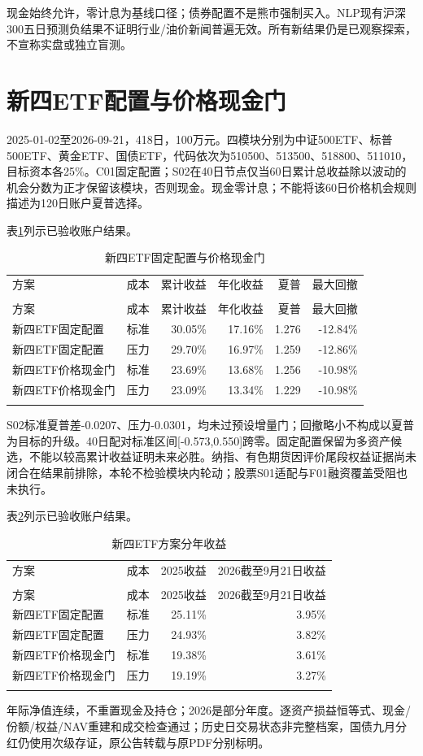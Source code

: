 \documentclass[12pt]{article}
\newcommand{\toprule}{\noalign{\hrule height .8pt}}
\newcommand{\midrule}{\noalign{\hrule height .4pt}}
\newcommand{\bottomrule}{\noalign{\hrule height .8pt}}
\begin{document}
现金始终允许，零计息为基线口径；债券配置不是熊市强制买入。NLP现有沪深300五日预测负结果不证明行业/油价新闻普遍无效。所有新结果仍是已观察探索，不宣称实盘或独立盲测。

\section{新四ETF配置与价格现金门}
2025-01-02至2026-09-21，418日，100万元。四模块分别为中证500ETF、标普500ETF、黄金ETF、国债ETF，代码依次为510500、513500、518800、511010，目标资本各25\%。C01固定配置；S02在40日节点仅当60日累计总收益除以波动的机会分数为正才保留该模块，否则现金。现金零计息；不能将该60日价格机会规则描述为120日账户夏普选择。

表\ref{tab:v3supp3}列示已验收账户结果。
{\footnotesize
\begin{longtable}{@{}lrrrrr@{}}
\caption{新四ETF固定配置与价格现金门}\label{tab:v3supp3}\\
\toprule
方案 & 成本 & 累计收益 & 年化收益 & 夏普 & 最大回撤 \\
\midrule\endfirsthead
\multicolumn{6}{c}{表\thetable（续）}\\\toprule
方案 & 成本 & 累计收益 & 年化收益 & 夏普 & 最大回撤 \\\midrule\endhead
新四ETF固定配置 & 标准 & 30.05\% & 17.16\% & 1.276 & -12.84\% \\
新四ETF固定配置 & 压力 & 29.70\% & 16.97\% & 1.259 & -12.86\% \\
新四ETF价格现金门 & 标准 & 23.69\% & 13.68\% & 1.256 & -10.98\% \\
新四ETF价格现金门 & 压力 & 23.09\% & 13.34\% & 1.229 & -10.98\% \\
\bottomrule\end{longtable}}
S02标准夏普差-0.0207、压力-0.0301，均未过预设增量门；回撤略小不构成以夏普为目标的升级。40日配对标准区间[-0.573,0.550]跨零。固定配置保留为多资产候选，不能以较高累计收益证明未来必胜。纳指、有色期货因评价尾段权益证据尚未闭合在结果前排除，本轮不检验模块内轮动；股票S01适配与F01融资覆盖受阻也未执行。

表\ref{tab:v3supp4}列示已验收账户结果。
{\footnotesize
\begin{longtable}{@{}lrrr@{}}
\caption{新四ETF方案分年收益}\label{tab:v3supp4}\\
\toprule
方案 & 成本 & 2025收益 & 2026截至9月21日收益 \\
\midrule\endfirsthead
\multicolumn{4}{c}{表\thetable（续）}\\\toprule
方案 & 成本 & 2025收益 & 2026截至9月21日收益 \\\midrule\endhead
新四ETF固定配置 & 标准 & 25.11\% & 3.95\% \\
新四ETF固定配置 & 压力 & 24.93\% & 3.82\% \\
新四ETF价格现金门 & 标准 & 19.38\% & 3.61\% \\
新四ETF价格现金门 & 压力 & 19.19\% & 3.27\% \\
\bottomrule\end{longtable}}
年际净值连续，不重置现金及持仓；2026是部分年度。逐资产损益恒等式、现金/份额/权益/NAV重建和成交检查通过；历史日交易状态非完整档案，国债九月分红仍使用次级存证，原公告转载与原PDF分别标明。
\end{document}
